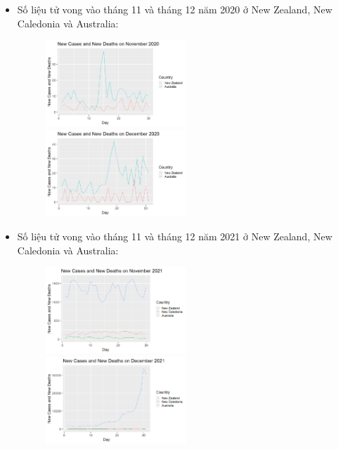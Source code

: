 \documentclass[a4paper]{article}
\theoremstyle{definition}
\begin{document}
\begin{enumerate}[i)]
\begin{enumerate}[1]
    \begin{itemize}
    \item{Số liệu tử vong vào tháng 11 và tháng 12 năm 2020 ở New Zealand, New Caledonia và Australia:}\\ 
     \begin{figure}[htp!]
    \includegraphics[width=0.5\textwidth]{Images/6.1v.png}
    \includegraphics[width=0.5\textwidth]{Images/6.2v.png}
  \end{figure}
    \end{itemize}
    
    \begin{itemize}
    \item{Số liệu tử vong vào tháng 11 và tháng 12 năm 2021 ở New Zealand, New Caledonia và Australia:}\\ 
     \begin{figure}[htp!]
    \includegraphics[width=0.5\textwidth]{Images/6.3v.png}
    \includegraphics[width=0.5\textwidth]{Images/6.4v.png}
  \end{figure}
    \end{itemize}
    \vspace{2cm}
    

\end{enumerate}
\end{enumerate}
\end{document}
